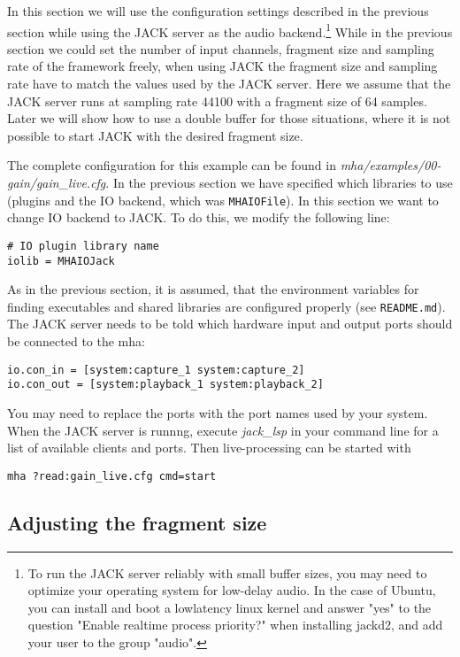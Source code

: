 In this section we will use the configuration settings described in
the previous section while using the JACK server as the audio
backend.\footnote{To run the JACK server reliably with small buffer
  sizes, you may need to optimize your operating system for low-delay
  audio. In the case of Ubuntu, you can install and boot a lowlatency
  linux kernel and answer "yes" to the question "Enable realtime process
  priority?" when installing jackd2, and add your user to the group
  "audio".
}
%
While in the previous section
we could  set the number of 
input channels, fragment size and sampling rate of the framework freely,
when using JACK the fragment size
and sampling rate have to match the values used by the JACK server.
%
Here we assume that the JACK server runs at sampling rate 44100 with a
fragment size of 64 samples.
%
Later we will show how to use a double buffer for those
situations, where it is not possible to start JACK with the desired
fragment size. 

The complete configuration for this example can be found in
\emph{mha/examples/00-gain/gain\_live.cfg}.
In the previous section we have specified which libraries to use
(plugins and the IO backend, which was \verb!MHAIOFile!). In this section 
we want to change IO backend to JACK. 
%
To do this, we modify the following line:
\begin{verbatim}
# IO plugin library name
iolib = MHAIOJack
\end{verbatim}
%
As in the previous section, it is assumed, that the environment
variables for finding executables and shared libraries are configured
properly (see \verb!README.md!).
The JACK server needs to be told which hardware input and output ports should be
connected to the mha:
\begin{verbatim}
io.con_in = [system:capture_1 system:capture_2]
io.con_out = [system:playback_1 system:playback_2]
\end{verbatim}
You may need to replace the ports with the port names used
by your system.
When the JACK server is runnng, execute \emph{jack\_lsp} in your command
line for a list of available clients and ports.
%
Then \mha{} live-processing can be started with
\begin{verbatim}
mha ?read:gain_live.cfg cmd=start
\end{verbatim}

\subsection{Adjusting the fragment size}%
%
%

